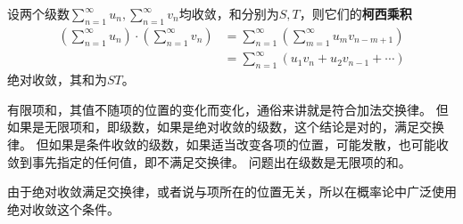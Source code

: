 \begin{theorem}[柯西乘积定理]
设两个级数$\sum_{n=1}^{\infty}{u_n},\sum_{n=1}^{\infty}{v_n}$均收敛，和分别为$S,T$，则它们的{\bf 柯西乘积}
\begin{align*}
\left( \sum_{n=1}^{\infty}{u_n} \right) \cdot \left( \sum_{n=1}^{\infty}{v_n} \right) &=\sum_{n=1}^{\infty}{\left( \sum_{m=1}^{\infty}{u_mv_{n-m+1}} \right)} \\
&=\sum_{n=1}^{\infty}{\left( u_1v_n+u_2v_{n-1}+\cdots \right)}
\end{align*}
绝对收敛，其和为$ST$。
\end{theorem}

有限项和，其值不随项的位置的变化而变化，通俗来讲就是符合加法交换律。
但如果是无限项和，即级数，如果是绝对收敛的级数，这个结论是对的，满足交换律。
但如果是条件收敛的级数，如果适当改变各项的位置，可能发散，也可能收敛到事先指定的任何值，即不满足交换律。
问题出在级数是无限项的和。

\begin{tcolorbox}
由于绝对收敛满足交换律，或者说与项所在的位置无关，所以在概率论中广泛使用绝对收敛这个条件。
\end{tcolorbox}




